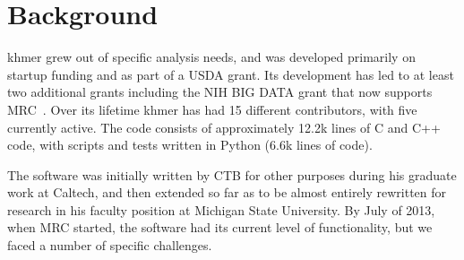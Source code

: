 \documentclass[12pt]{article}
\begin{document}
\section{Background}

khmer grew out of specific analysis needs, and was developed primarily
on startup funding and as part of a USDA grant.  Its development has
led to at least two additional grants including the NIH BIG DATA
grant that now supports MRC~\cite{brown2012bigdata}.  Over its lifetime
khmer has had 15 different contributors, with five currently active.
The code consists of approximately 12.2k lines of C and C++ code, with
scripts and tests written in Python (6.6k lines of code).

The software was initially written by CTB for other purposes during
his graduate work at Caltech, and then extended so far as to be almost
entirely rewritten for research in his faculty position at Michigan
State University.  By July of 2013, when MRC started, the software had
its current level of functionality, but we faced a number of specific
challenges.
\end{document}
